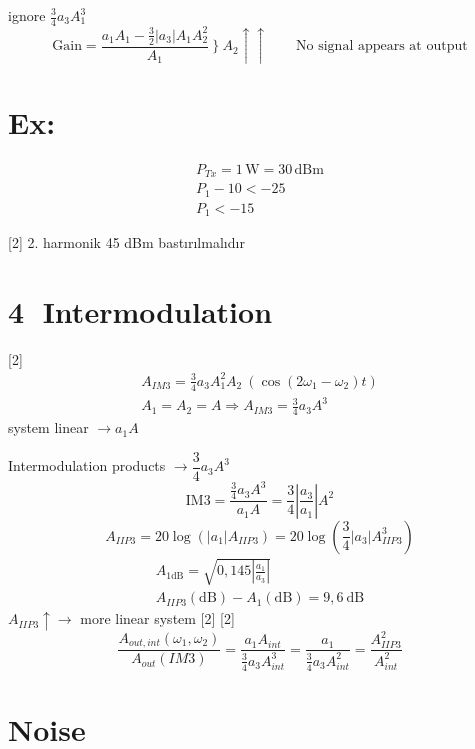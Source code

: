 \documentclass[11pt,a4paper]{article}
\begin{document}
ignore $\frac{3}{4}a_3A_1^3$
\[ \mathrm{Gain} = \frac{a_1A_1-\frac{3}{2}|a_3|A_1A_2^2}{A_1}\ \Big\}\ A_2\!\uparrow\!\uparrow \qquad \text{No signal appears at output} \]

\section{Ex:}
\begin{gather*}
P_{Tx} = 1\,\mathrm{W} = 30\,\mathrm{dBm}\\
P_1-10 < -25\\
P_1 < -15
\end{gather*}

[2]
2. harmonik 45 dBm bastırılmalıdır

\section{\textcircled{4} Intermodulation}
[2]
\begin{gather*}
A_{IM3} = \frac{3}{4}a_3A_1^2A_2\ \left(\cos(2\omega_1-\omega_2)t\right)\\
A_1=A_2=A \Rightarrow A_{IM3} = \frac{3}{4}a_3A^3
\end{gather*}
system linear $\to a_1A$

Intermodulation products $\to \dfrac{3}{4}a_3A^3$
\[ \mathrm{IM3} = \frac{\frac{3}{4}a_3A^3}{a_1A} = \frac{3}{4}\left|\frac{a_3}{a_1}\right|A^2 \]
\[ A_{IIP3} = 20\log(|a_1|A_{IIP3}) = 20\log\left(\frac{3}{4}|a_3|A_{IIP3}^3\right) \]
\begin{gather*}
A_{1\mathrm{dB}} = \sqrt{0{,}145\left|\frac{a_1}{a_3}\right|}\\
A_{IIP3}(\mathrm{dB})-A_1(\mathrm{dB}) = 9{,}6\ \mathrm{dB}
\end{gather*}
$A_{IIP3}\uparrow \to$ more linear system
[2]
[2]
\[ \frac{A_{out,int}(\omega_1,\omega_2)}{A_{out}(IM3)} = \frac{a_1A_{int}}{\frac{3}{4}a_3A_{int}^3} = \frac{a_1}{\frac{3}{4}a_3A_{int}^2} = \frac{A_{IIP3}^2}{A_{int}^2} \]

\section{Noise}
\end{document}
